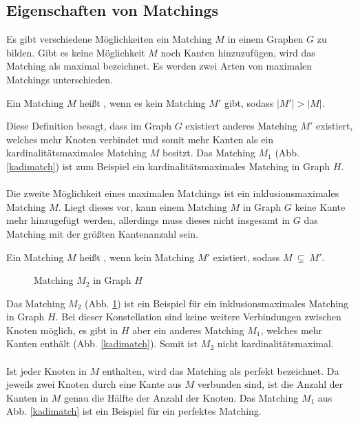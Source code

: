 \subsection{Eigenschaften von Matchings}
Es gibt verschiedene Möglichkeiten ein Matching $M$ in einem Graphen $G$ zu bilden. Gibt es keine Möglichkeit $M$ noch Kanten hinzuzufügen, wird das Matching als maximal bezeichnet. Es werden zwei Arten von maximalen Matchings unterschieden. 

\begin{df}
Ein Matching $M$ heißt , wenn es kein Matching $M'$ gibt, sodass $|M'| > |M|$.
\end{df}

\noindent Diese Definition besagt, dass im Graph $G$ existiert anderes Matching $M'$ existiert, welches mehr Knoten verbindet und somit mehr Kanten als ein kardinalitätsmaximales Matching $M$ besitzt.
Das Matching $M_{1}$ (Abb. \ref{kadimatch}) ist zum Beispiel ein kardinalitätsmaximales Matching in Graph $H$.
\\
\\ Die zweite Möglichkeit eines maximalen Matchings ist ein inklusionsmaximales Matching $M$. Liegt dieses vor, kann einem Matching $M$ in Graph $G$ keine Kante mehr hinzugefügt werden, allerdings muss dieses nicht insgesamt in $G$ das Matching mit der größten Kantenanzahl sein. 

\begin{df}
Ein Matching $M$ heißt , wenn kein Matching $M'$ existiert, sodass $M \  \subsetneq\ M'$.
\end{df}

\begin{figure}[ht]
\centering
\caption{Matching $M_{2}$ in Graph $H$}
\label{inklumatch}
\end{figure}

\noindent Das Matching $M_{2}$ (Abb. \ref{inklumatch}) ist ein Beispiel für ein inklusionsmaximales Matching in Graph $H$. Bei dieser Konstellation sind keine weitere Verbindungen zwischen Knoten möglich, es gibt in $H$ aber ein anderes Matching $M_{1}$, welches mehr Kanten enthält (Abb. \ref{kadimatch}). Somit ist $M_{2}$ nicht kardinalitätsmaximal.
\\ \noindent \phantom{A}
\\ Ist jeder Knoten in $M$ enthalten, wird das Matching als perfekt bezeichnet. Da jeweils zwei Knoten durch eine Kante aus $M$ verbunden sind, ist die Anzahl der Kanten in $M$ genau die Hälfte der Anzahl der Knoten. Das Matching $M_{1}$ aus Abb. \ref{kadimatch} ist ein Beispiel für ein perfektes Matching. 

